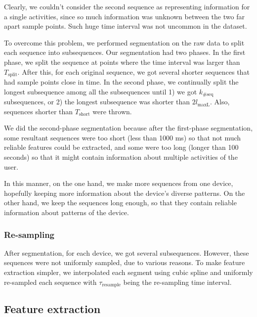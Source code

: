 \documentclass{article} %
\begin{document}
Clearly, we couldn't consider the second sequence as representing information for a single activities, since so much information was unknown between the two far apart sample points. Such huge time interval was not uncommon in the dataset. %

To overcome this problem, we performed segmentation on the raw data to split each sequence into subsequences. Our segmentation had two phases. In the first phase, we split the sequence at points where the time interval was larger than $T_\mathrm{split}$. After this, for each original sequence, we got several shorter sequences that had sample points close in time. In the second phase, we continually split the longest subsequence among all the subsequences until 1) we got $k_\mathrm{\#seq}$ subsequences, or 2) the longest subsequence was shorter than $2 l_\mathrm{maxL}$. Also, sequences shorter than $T_\mathrm{short}$ were thrown.

We did the second-phase segmentation because after the first-phase segmentation, some resultant sequences were too short (less than 1000 ms) so that not much reliable features could be extracted, and some were too long (longer than 100 seconds) so that it might contain information about multiple activities of the user. 

In this manner, on the one hand, we make more sequences from one device, hopefully keeping more information about the device's diverse patterns. On the other hand, we keep the sequences long enough, so that they contain reliable information about patterns of the device.

\subsubsection{Re-sampling} 
After segmentation, for each device, we got several subsequences. However, these sequences were not uniformly sampled, due to various reasons. To make feature extraction simpler, we interpolated each segment using cubic spline and uniformly re-sampled each sequence with  $\tau_\mathrm{resample}$ being the re-sampling time interval.

\subsection{Feature extraction}
\label{feautures}
\end{document}
